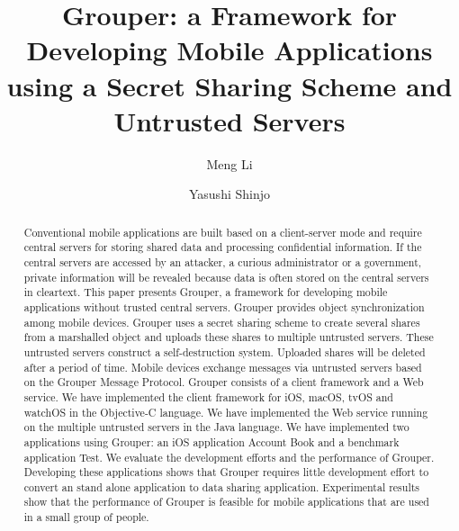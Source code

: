 \documentclass[sigconf]{acmart}
\begin{document}
\title{Grouper: a Framework for Developing Mobile Applications using a Secret Sharing Scheme and Untrusted Servers}

\author{Meng Li}

\author{Yasushi Shinjo}

\renewcommand{\shortauthors}{Li et al.}

\begin{abstract}
	
Conventional mobile applications are built based on a client-server mode and require central servers for storing shared data and processing confidential information.
If the central servers are accessed by an attacker, a curious administrator or a government, private information will be revealed because data is often stored on the central servers in cleartext.
This paper presents Grouper, a framework for developing mobile applications without trusted central servers.
Grouper provides object synchronization among mobile devices.
Grouper uses a secret sharing scheme to create several shares from a marshalled object and uploads these shares to multiple untrusted servers. 
These untrusted servers construct a self-destruction system.
Uploaded shares will be deleted after a period of time.
Mobile devices exchange messages via untrusted servers based on the Grouper Message Protocol.
Grouper consists of a client framework and a Web service.
We have implemented the client framework for iOS, macOS, tvOS and watchOS in the Objective-C language.
We have implemented the Web service running on the multiple untrusted servers in the Java language.
We have implemented two applications using Grouper: an iOS application Account Book and a benchmark application Test.
We evaluate the development efforts and the performance of Grouper. 
Developing these applications shows that Grouper requires little development effort to convert an stand alone application to data sharing application.
Experimental results show that the performance of Grouper is feasible for mobile applications that are used in a small group of people.

\end{abstract}


\maketitle




 
\end{document}
